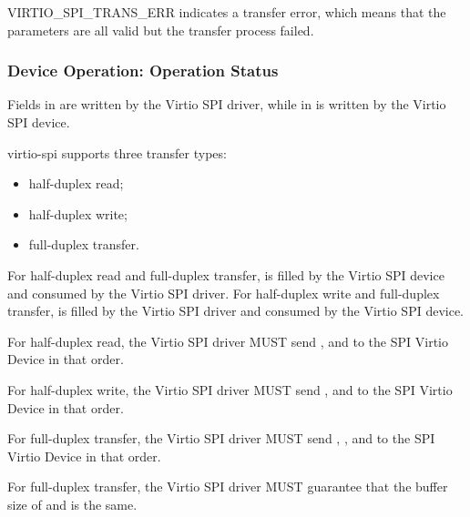 VIRTIO_SPI_TRANS_ERR indicates a transfer error, which means that the parameters are all
valid but the transfer process failed.

\subsubsection{Device Operation: Operation Status}\label{sec:Device Types / SPI Controller Device / Device Operation: Operation Status}

Fields in  are written by the Virtio SPI driver, while
 in  is written by the Virtio SPI device.

virtio-spi supports three transfer types:
\begin{itemize}
\item half-duplex read;
\item half-duplex write;
\item full-duplex transfer.
\end{itemize}

For half-duplex read and full-duplex transfer,  is filled by the Virtio SPI device
and consumed by the Virtio SPI driver. For half-duplex write and full-duplex transfer, 
is filled by the Virtio SPI driver and consumed by the Virtio SPI device.


For half-duplex read, the Virtio SPI driver MUST send ,
 and  to the SPI Virtio Device in that order.

For half-duplex write, the Virtio SPI driver MUST send ,
 and  to the SPI Virtio Device in that order.

For full-duplex transfer, the Virtio SPI driver MUST send ,
,  and  to the SPI Virtio Device
in that order.

For full-duplex transfer, the Virtio SPI driver MUST guarantee that the buffer size of 
and  is the same.

